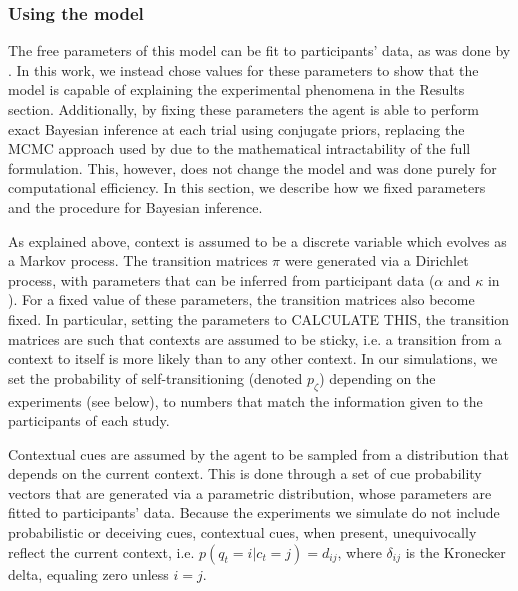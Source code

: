 \documentclass[a4paper,doc,floatsintext,natbib]{apa6}
\begin{document}
\subsubsection{Using the model}
The free parameters of this model can be fit to participants' data, as was done by \cite{Heald_Contextual_2021}. In this work, we instead chose values for these parameters to show that the model is capable of explaining the experimental phenomena in the Results section. Additionally, by fixing these parameters the agent is able to perform exact Bayesian inference at each trial using conjugate priors, replacing the MCMC approach used by \cite{Heald_Contextual_2021} due to the mathematical intractability of the full formulation. This, however, does not change the model and was done purely for computational efficiency. In this section, we describe how we fixed parameters and the procedure for Bayesian inference.

As explained above, context is assumed to be a discrete variable which evolves as a Markov process. The transition matrices $\pi$ were generated via a Dirichlet process, with parameters that can be inferred from participant data ($\alpha$ and $\kappa$ in \cite{Heald_Contextual_2021}). For a fixed value of these parameters, the transition matrices also become fixed. In particular, setting the parameters to CALCULATE THIS, the transition matrices are such that contexts are assumed to be sticky, i.e. a transition from a context to itself is more likely than to any other context. In our simulations, we set the probability of self-transitioning (denoted $p_\zeta$) depending on the experiments (see below), to numbers that match the information given to the participants of each study.

Contextual cues are assumed by the agent to be sampled from a distribution that depends on the current context. This is done through a set of cue probability vectors that are generated via a parametric distribution, whose parameters are fitted to participants' data. Because the experiments we simulate do not include probabilistic or deceiving cues, contextual cues, when present, unequivocally reflect the current context, i.e. $p(q_t = i | c_t = j) = d_{ij}$, where $\delta_{ij}$ is the Kronecker delta, equaling zero unless $i = j$.
\end{document}
